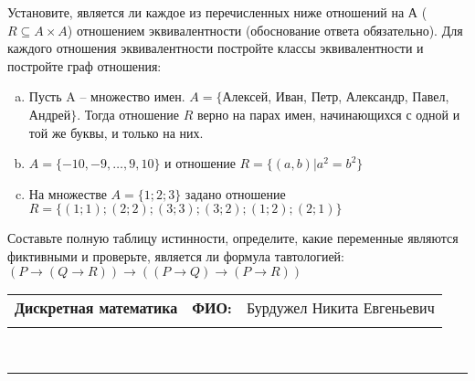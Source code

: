 \documentclass[10pt]{exam}
\newcommand{\class}{Дискретная математика}
\newcommand{\examdate}{}
\begin{document}
\begin{questions}
\question
Установите, является ли каждое из перечисленных ниже отношений на А ($R \subseteq A \times A$) отношением эквивалентности (обоснование ответа обязательно). Для каждого отношения эквивалентности постройте классы 
эквивалентности и постройте граф отношения:
\begin{enumerate} [a)]\setcounter{enumi}{0}
\item Пусть A – множество имен. $A = \{ $Алексей, Иван, Петр, Александр, Павел, Андрей$ \}$. Тогда отношение $R$ верно на парах имен, начинающихся с одной и той же буквы, и только на них.
\item $A = \{-10, -9, … , 9, 10\}$ и отношение $ R = \{(a,b)|a^{2} = b^{2}\}$
\item На множестве $A = \{1; 2; 3\}$ задано отношение $R = \{(1; 1); (2; 2); (3; 3); (3; 2); (1; 2); (2; 1)\}$
\end{enumerate}\question Составьте полную таблицу истинности, определите, какие переменные являются фиктивными и проверьте, является ли формула тавтологией:
$(P \rightarrow (Q \rightarrow R)) \rightarrow ((P \rightarrow Q) \rightarrow (P \rightarrow R))$

\end{questions}
\newpage
\begin{flushright}
\begin{tabular}{p{2.8in} r l}
\textbf{\class} & \textbf{ФИО:} &Бурдужел Никита Евгеньевич
\\

\textbf{\examdate} &&\\
\end{tabular}\\
\end{flushright}
\rule[1ex]{\textwidth}{.1pt}
\end{document}
